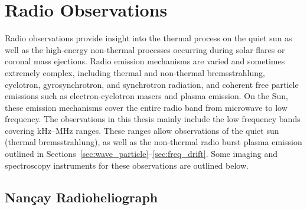 \section{Radio Observations}\label{sec:3}

Radio observations provide insight into the thermal process on the quiet sun as well as the high-energy non-thermal processes occurring during solar flares or coronal mass ejections. Radio emission mechanisms are varied and sometimes extremely complex, including thermal and non-thermal bremsstrahlung, cyclotron, gyrosynchrotron, and synchrotron radiation, and coherent free particle emissions such as electron-cyclotron masers and plasma emission. On the Sun, these emission mechanisms cover the entire radio band from microwave to low frequency. The observations in this thesis mainly include the low frequency bands covering kHz--MHz ranges. These ranges allow observations of the quiet sun (thermal bremsstrahlung), as well as the non-thermal radio burst plasma emission outlined in Sections~\ref{sec:wave_particle}--\ref{sec:freq_drift}. Some imaging and spectroscopy instruments for these observations are outlined below.


\subsection{Nan\c{c}ay Radioheliograph}\label{sec:33}

